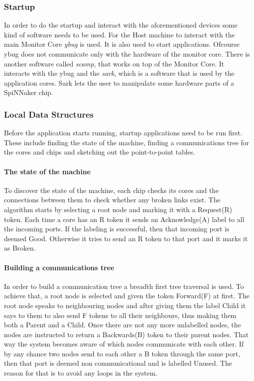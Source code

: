 \documentclass[12pt,a4paper]{article}
\begin{document}
\subsubsection{Startup}
In order to do the startup and interact with the aforementioned devices some kind of software needs to be used. For the Host machine to interact with the main Monitor Core \emph{ybug} is used. It is also used to start applications. Ofcourse ybug does not communicate only with the hardware of the monitor core. There is another software called \emph{scamp}, that works on top of the Monitor Core. It interacts with the ybug and the \emph{sark}, which is a software that is used by the application cores. Sark lets the user to manipulate some hardware parts of a SpiNNaker chip.\cite{spinnweb}
\subsubsection{Local Data Structures}
Before the application starts running, startup applications need to be run first. These include finding the state of the machine, finding a communications tree for the cores and chips and sketching out the point-to-point tables.

\paragraph{The state of the machine}
To discover the state of the machine, each chip checks its cores and the connections between them to check whether any broken links exist. The algorithm starts by selecting a root node and marking it with a Request(R) token. Each time a core has an R token it sends an Acknowledge(A) label to all the incoming ports. If the labeling is successful, then that incoming port is deemed Good. Otherwise it tries to send an R token to that port and it marks it as Broken\cite{jefflec}.
\paragraph{Building a communications tree}
In order to build a communication tree a breadth first tree traversal is used. To achieve that, a root node is selected and given the token Forward(F) at first. The root node speaks to neighbouring nodes and after giving them the label Child it says to them to also send F tokens to all their neighbours, thus making them both a Parent and a Child. Once there are not any more unlabelled nodes, the nodes are instructed to return a Backwards(B) token to their parent nodes. That way the system becomes aware of which nodes communicate with each other. If by any chance two nodes send to each other a B token through the same port, then that port is deemed non communicational and is labelled Unused. The reason for that is to avoid any loops in the system\cite{jefflec}.
\end{document}
